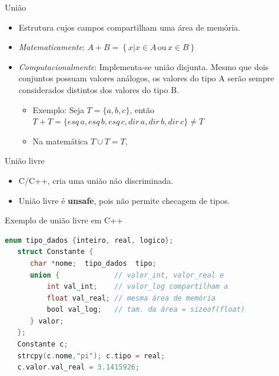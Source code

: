 \documentclass[handout]{beamer}
\begin{document}
\begin{frame}{União}
   \begin{itemize}
			\item Estrutura cujos campos compartilham uma área de memória.

			\item \textit{Matematicamente}: $A + B = \left\{ x | x \in A\, \mathrm{ou}\, x \in B \right\}$

			\item \textit{Computacionalmente}: Implementa-se união disjunta. Mesmo que dois conjuntos possuam valores análogos, os valores do tipo A serão sempre considerados distintos dos valores do tipo B.
				\begin{itemize}
					\item Exemplo: Seja $T = \{ a, b, c\}$, então $ T + T =\{ esq\, a, esq\, b, esq\, c, dir\, a, dir\, b, dir\, c \} \neq T$
					\item Na matemática $T \cup T = T$,
				\end{itemize}
		\end{itemize}
\end{frame}



\begin{frame}[fragile]{União livre}
\begin{itemize}
	\item C/C++, cria uma união não discriminada.
    \item União livre é \textbf{unsafe}, pois não permite checagem de tipos.
\end{itemize}

\begin{block}{Exemplo de união livre em C++ }
	\begin{lstlisting}[language=C,numbers=none]
   enum tipo_dados {inteiro, real, logico};
   struct Constante {
      char *nome;  tipo_dados  tipo;
      union {             // valor_int, valor_real e
          int val_int;    // valor_log compartilham a
          float val_real; // mesma área de memória
          bool val_log;   // tam. da área = sizeof(float)
      } valor;
   };
   Constante c;
   strcpy(c.nome,"pi"); c.tipo = real;
   c.valor.val_real = 3.1415926;
	\end{lstlisting}
\end{block}

\end{frame}
\end{document}
